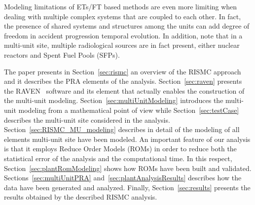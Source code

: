 Modeling limitations of ETs/FT based methods are even more limiting when dealing with 
multiple complex systems that are coupled to each other. In fact, the presence of shared 
systems and structures among the units can add degree of freedom in accident progression 
temporal evolution.
In addition, note that in a multi-unit site, multiple radiological sources are in fact present, 
either nuclear reactors and Spent Fuel Pools (SFPs). 

The paper presents in Section~\ref{sec:rismc} an overview of the RISMC approach and it describes
the PRA elements of the analysis. Section~\ref{sec:raven} presents the RAVEN~\cite{RAVEN_PSAM_2014} 
software and its element that actually enables the construction of the multi-unit modeling. 
Section~\ref{sec:multiUnitModeling} introduces the multi-unit modeling from a mathematical 
point of view while Section~\ref{sec:testCase} describes the multi-unit site considered in the
analysis.
Section~\ref{sec:RISMC_MU_modeling} describes in detail of the modeling of all elements multi-unit
site have been modeled.
An important feature of our analysis is that it employs Reduce Order Models (ROMs) in order to
reduce both the statistical error of the analysis and the computational time. In this respect,
Section~\ref{sec:plantRomModeling} shows how ROMs have been built and validated.
Sections~\ref{sec:multiUnitPRA} and~\ref{sec:plantAnalysisResults} describes how the data have been 
generated and analyzed.
Finally, Section~\ref{sec:results} presents the results obtained by the described RISMC analysis.
 




